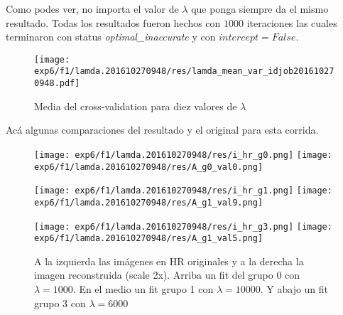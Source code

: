 \documentclass[a4paper,10pt]{article}
\begin{document}
Como podes ver, no importa el valor de $\lambda$ que ponga siempre da el mismo resultado. Todas los resultados fueron hechos 
con $1000$ iteraciones las cuales terminaron con status \textit{optimal\_inaccurate} y con $intercept=False$.


\begin{figure}[H]
\texttt{[image: exp6/f1/lamda.201610270948/res/lamda\_mean\_var\_idjob201610270948.pdf]}
\caption{Media del cross-validation para diez valores de $\lambda$ }
\label{varlambda}
\end{figure}


Acá algunas comparaciones del resultado y el original para esta corrida.


\begin{figure}[H]
\texttt{[image: exp6/f1/lamda.201610270948/res/i\_hr\_g0.png]}
\texttt{[image: exp6/f1/lamda.201610270948/res/A\_g0\_val0.png]}

\texttt{[image: exp6/f1/lamda.201610270948/res/i\_hr\_g1.png]}
\texttt{[image: exp6/f1/lamda.201610270948/res/A\_g1\_val9.png]}


\texttt{[image: exp6/f1/lamda.201610270948/res/i\_hr\_g3.png]}
\texttt{[image: exp6/f1/lamda.201610270948/res/A\_g1\_val5.png]}

\caption{A la izquierda las imágenes en HR originales y a la derecha la imagen reconstruida (scale 2x). 
Arriba un fit del grupo 0 con $\lambda=1000$. En el medio un fit grupo 1 con $\lambda=10000$. Y abajo un fit grupo 3 con $\lambda=6000$}
\label{rlambda}
\end{figure}
\end{document}
